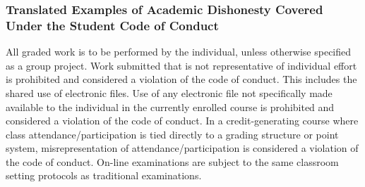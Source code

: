\documentclass[11pt,]{article}
\begin{document}
\hypertarget{translated-examples-of-academic-dishonesty-covered-under-the-student-code-of-conduct}{%
\subsubsection{Translated Examples of Academic Dishonesty Covered Under the Student Code of Conduct}\label{translated-examples-of-academic-dishonesty-covered-under-the-student-code-of-conduct}}

All graded work is to be performed by the individual, unless otherwise specified as a group project. Work
submitted that is not representative of individual effort is prohibited and considered a violation of the code of
conduct. This includes the shared use of electronic files. Use of any electronic file not specifically made
available to the individual in the currently enrolled course is prohibited and considered a violation of the
code of conduct. In a credit-generating course where class attendance/participation is tied directly to a
grading structure or point system, misrepresentation of attendance/participation is considered a
violation of the code of conduct. On-line examinations are subject to the same classroom setting
protocols as traditional examinations.
\end{document}

